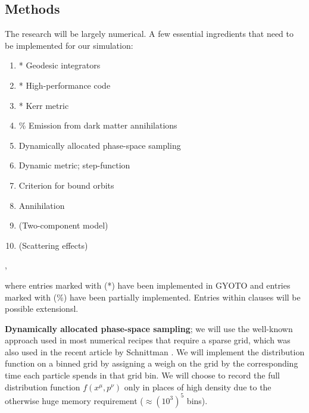 \documentclass[12pt]{article}
\begin{document}
\subsection{Methods} \label{ssec:methods}



The research will be largely numerical. A few essential ingredients that need to be implemented for our simulation:

\begin{enumerate}
 \item * Geodesic integrators
 \item * High-performance code %
 \item * Kerr metric
 \item \% Emission from dark matter annihilations
 \item Dynamically allocated phase-space sampling
 \item Dynamic metric; step-function
 \item Criterion for bound orbits
 \item Annihilation
 \item (Two-component model)
 \item (Scattering effects)
\end{enumerate},

where entries marked with (*) have been implemented in GYOTO \citep{gyoto_vincent_2011} and entries marked with (\%) have been partially implemented. 
Entries within clauses will be possible extensionsl.

\textbf{Dynamically allocated phase-space sampling}; we will use the well-known approach used in most numerical recipes that require 
a sparse grid, which was also used in the recent article by Schnittman \citep{schnittman2015}. %
We will implement the distribution function on a binned grid by assigning a weigh on the grid by the corresponding time each particle spends in 
that grid bin. We will choose to record the full distribution function $f(x^\mu,p^\nu)$ only in places of high density due to the otherwise 
huge memory requirement ($\approx (10^3)^5$ bins)\citep{schnittman2015}.
\end{document}
